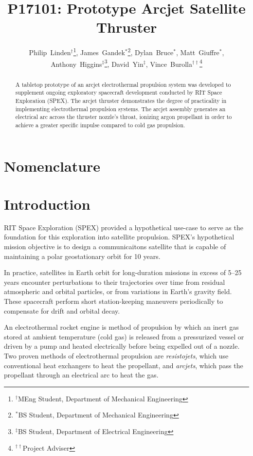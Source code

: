\documentclass[journal]{IEEEtran}
\title{P17101: Prototype Arcjet Satellite Thruster}
\author{
  Philip~Linden$^{\dagger}$\thanks{$^{\dagger}$MEng Student, Department of Mechanical Engineering},
  James~Gandek$^{*}$\thanks{$^{*}$BS Student, Department of Mechanical Engineering},
  Dylan~Bruce$^{*}$,
  Matt~Giuffre$^{*}$,
  Anthony~Higgins$^{\ddagger}$\thanks{$^{\ddagger}$BS Student, Department of Electrical Engineering},
  David~Yin$^{\ddagger}$,
  Vince~Burolla$^{\dagger\dagger}$\thanks{$^{\dagger\dagger}$Project Adviser}
}
\begin{document}
\maketitle


\begin{abstract}
A tabletop prototype of an arcjet electrothermal propulsion system was developed to supplement ongoing exploratory spacecraft development conducted by RIT Space Exploration (SPEX). The arcjet thruster demonstrates the degree of practicality in implementing electrothermal propulsion systems. The arcjet assembly generates an electrical arc across the thruster nozzle's throat, ionizing argon propellant in order to achieve a greater specific impulse compared to cold gas propulsion.
\end{abstract}

\section{Nomenclature}
\label{sec:nomenclature}

\section{Introduction}
\label{sec:intro}
RIT Space Exploration (SPEX) provided a hypothetical use-case to serve as the foundation for this exploration into satellite propulsion.
SPEX's hypothetical mission objective is to design a communicaitons satellite that is capable of maintaining a polar geostationary orbit for 10 years.

In practice, satellites in Earth orbit for long-duration missions in excess of 5--25 years encounter perturbations to their trajectories over time from residual atmospheric and orbital particles, or from variations in Earth's gravity field.
These spacecraft perform short station-keeping maneuvers periodically to compensate for drift and orbital decay.

An electrothermal rocket engine is method of propulsion by which an inert gas stored at ambient temperature (cold gas) is released from a pressurized vessel or driven by a pump and heated electrically before being expelled out of a nozzle.
Two proven methods of electrothermal propulsion are \emph{resistojets}, which use conventional heat exchangers to heat the propellant, and \emph{arcjets}, which pass the propellant through an electrical arc to heat the gas.
\end{document}
